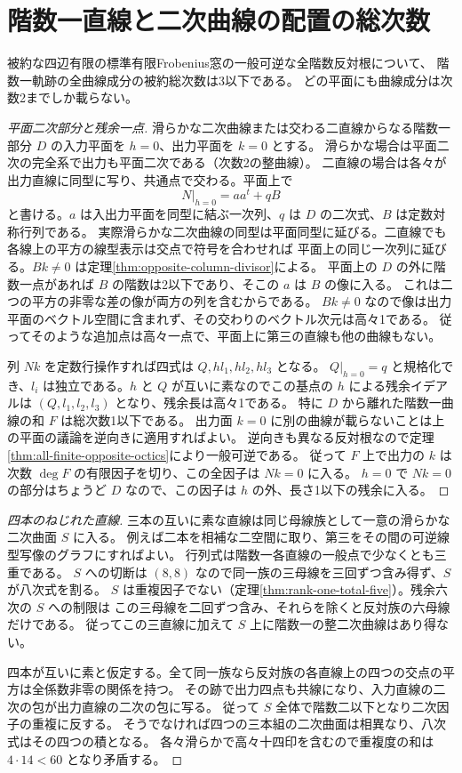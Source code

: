 \section{階数一直線と二次曲線の配置の総次数}
\label{sec:rank-one-low-degree-arrangements}
\begin{theorem}\label{thm:rank-one-low-degree-arrangements}
被約な四辺有限の標準有限Frobenius窓の一般可逆な全階数反対根について、
階数一軌跡の全曲線成分の被約総次数は3以下である。
どの平面にも曲線成分は次数2までしか載らない。
\end{theorem}
\begin{proof}[平面二次部分と残余一点]
滑らかな二次曲線または交わる二直線からなる階数一部分 $D$ の入力平面を $h=0$、出力平面を $k=0$ とする。
滑らかな場合は平面二次の完全系で出力も平面二次である（次数2の整曲線）。
二直線の場合は各々が出力直線に同型に写り、共通点で交わる。平面上で
\[
             N|_{h=0}=aa^t+qB
\]
と書ける。$a$ は入出力平面を同型に結ぶ一次列、$q$ は $D$ の二次式、$B$ は定数対称行列である。
実際滑らかな二次曲線の同型は平面同型に延びる。二直線でも各線上の平方の線型表示は交点で符号を合わせれば
平面上の同じ一次列に延びる。$Bk\ne0$ は定理\ref{thm:opposite-column-divisor}による。
平面上の $D$ の外に階数一点があれば $B$ の階数は2以下であり、そこの $a$ は $B$ の像に入る。
これは二つの平方の非零な差の像が両方の列を含むからである。
$Bk\ne0$ なので像は出力平面のベクトル空間に含まれず、その交わりのベクトル次元は高々1である。
従ってそのような追加点は高々一点で、平面上に第三の直線も他の曲線もない。

列 $Nk$ を定数行操作すれば四式は $Q,h l_1,h l_2,h l_3$ となる。
$Q|_{h=0}=q$ と規格化でき、$l_i$ は独立である。$h$ と $Q$ が互いに素なのでこの基点の $h$ による残余イデアルは
$(Q,l_1,l_2,l_3)$ となり、残余長は高々1である。
特に $D$ から離れた階数一曲線の和 $F$ は総次数1以下である。
出力面 $k=0$ に別の曲線が載らないことは上の平面の議論を逆向きに適用すればよい。
逆向きも異なる反対根なので定理\ref{thm:all-finite-opposite-octics}により一般可逆である。
従って $F$ 上で出力の $k$ は次数 $\deg F$ の有限因子を切り、この全因子は $Nk=0$ に入る。
$h=0$ で $Nk=0$ の部分はちょうど $D$ なので、この因子は $h$ の外、長さ1以下の残余に入る。
\end{proof}
\begin{proof}[四本のねじれた直線]
三本の互いに素な直線は同じ母線族として一意の滑らかな二次曲面 $S$ に入る。
例えば二本を相補な二空間に取り、第三をその間の可逆線型写像のグラフにすればよい。
行列式は階数一各直線の一般点で少なくとも三重である。
$S$ への切断は $(8,8)$ なので同一族の三母線を三回ずつ含み得ず、$S$ が八次式を割る。
$S$ は重複因子でない（定理\ref{thm:rank-one-total-five}）。残余六次の $S$ への制限は
この三母線を二回ずつ含み、それらを除くと反対族の六母線だけである。
従ってこの三直線に加えて $S$ 上に階数一の整二次曲線はあり得ない。

四本が互いに素と仮定する。全て同一族なら反対族の各直線上の四つの交点の平方は全係数非零の関係を持つ。
その跡で出力四点も共線になり、入力直線の二次の包が出力直線の二次の包に写る。
従って $S$ 全体で階数二以下となり二次因子の重複に反する。
そうでなければ四つの三本組の二次曲面は相異なり、八次式はその四つの積となる。
各々滑らかで高々十四印を含むので重複度の和は $4\cdot14<60$ となり矛盾する。
\end{proof}
